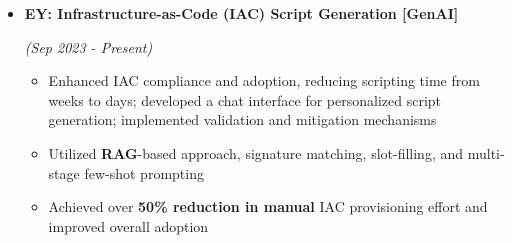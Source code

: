 \documentclass[a4paper,10pt]{article}
\newcommand{\isep}{-2 pt}
\begin{document}
\begin{itemize}
\item \textbf{EY: Infrastructure-as-Code (IAC) Script Generation [GenAI]}  \hfill {\emph{(Sep 2023 - Present)}\\[-0.6cm]
    \begin{itemize}\itemsep \isep
        \item Enhanced IAC compliance and adoption, reducing scripting time from weeks to days; developed a chat interface for personalized script generation; implemented validation and mitigation mechanisms
        \item Utilized \textbf{RAG}-based approach, signature matching, slot-filling, and multi-stage few-shot prompting
        \item Achieved over \textbf{50\% reduction in manual} IAC provisioning effort and improved overall adoption
        
    
        

\end{itemize}}
\end{itemize}
\end{document}
